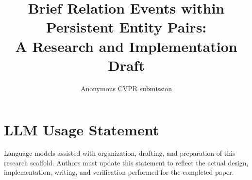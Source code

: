 \documentclass[10pt,twocolumn,letterpaper]{article}
\title{Brief Relation Events within Persistent Entity Pairs:\\A Research and Implementation Draft}
\author{Anonymous CVPR submission}
\begin{document}
\maketitle







{\small}
\section*{LLM Usage Statement}
Language models assisted with organization, drafting, and preparation of this
research scaffold. Authors must update this statement to reflect the actual
design, implementation, writing, and verification performed for the completed paper.
\end{document}
